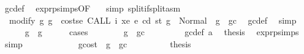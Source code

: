 \begin{isabellebody}
\ gc{\isacharunderscore}{\kern0pt}def\ \isamarkupfalse%
\ expr{\isachardot}{\kern0pt}psimps{\isacharparenleft}{\kern0pt}{}{}{\isacharparenright}{\kern0pt}{\isacharbrackleft}{\kern0pt}OF\ {}{}{\isacharparenleft}{\kern0pt}{}{\isacharparenright}{\kern0pt}{\isacharbrackright}{\kern0pt}\ \isamarkupfalse%
\ {\isacharparenleft}{\kern0pt}simp\ split{\isacharcolon}{\kern0pt}if{\isacharunderscore}{\kern0pt}split{\isacharunderscore}{\kern0pt}asm{\isacharparenright}{\kern0pt}\isanewline
\ \ \ \ \isamarkupfalse%
\ {\isacharasterisk}{\kern0pt}{\isacharasterisk}{\kern0pt}{\isacharcolon}{\kern0pt}\ {\isachardoublequoteopen}modify\ {\isacharparenleft}{\kern0pt}{\isasymlambda}g{\isachardot}{\kern0pt}\ g\ {\isacharminus}{\kern0pt}\ costs\isactrlsub e\ {\isacharparenleft}{\kern0pt}CALL\ i\ xe{\isacharparenright}{\kern0pt}\ e\ cd\ st{\isacharparenright}{\kern0pt}\ g\ {\isacharequal}{\kern0pt}\ Normal\ {\isacharparenleft}{\kern0pt}{\isacharparenleft}{\kern0pt}{\isacharparenright}{\kern0pt}{\isacharcomma}{\kern0pt}\ g\ {\isacharminus}{\kern0pt}\ gc{\isacharparenright}{\kern0pt}{\isachardoublequoteclose}\ \isamarkupfalse%
\ gc{\isacharunderscore}{\kern0pt}def\ \isamarkupfalse%
\ simp\isanewline
\ \ \ \ \isamarkupfalse%
\ {\isachardoublequoteopen}g{}{\isacharprime}{\kern0pt}\ {\isasymle}\ g{\isachardoublequoteclose}\isanewline
\ \ \ \ \isamarkupfalse%
\ {\isacharparenleft}{\kern0pt}cases{\isacharparenright}{\kern0pt}\isanewline
\ \ \ \ \ \ \isamarkupfalse%
\ {\isachardoublequoteopen}g\ {\isasymle}\ gc{\isachardoublequoteclose}\isanewline
\ \ \ \ \ \ \isamarkupfalse%
\ {}{}{\isacharparenleft}{\kern0pt}{}{\isacharparenright}{\kern0pt}\ gc{\isacharunderscore}{\kern0pt}def\ a{}\ \isamarkupfalse%
\ {\isacharquery}{\kern0pt}thesis\ \isamarkupfalse%
\ expr{\isachardot}{\kern0pt}psimps{\isacharparenleft}{\kern0pt}{}{}{\isacharparenright}{\kern0pt}\ \isamarkupfalse%
\ simp\isanewline
\ \ \ \ \isamarkupfalse%
\isanewline
\ \ \ \ \ \ \isamarkupfalse%
\ gcost{\isacharcolon}{\kern0pt}\ {\isachardoublequoteopen}{\isasymnot}\ g\ {\isasymle}\ gc{\isachardoublequoteclose}\isanewline
\ \ \ \ \ \ \isamarkupfalse%
\ \isamarkupfalse%
\ {\isacharquery}{\kern0pt}thesis\isanewline
\ \ \ \ \ \ \isamarkupfalse%

\end{isabellebody}
